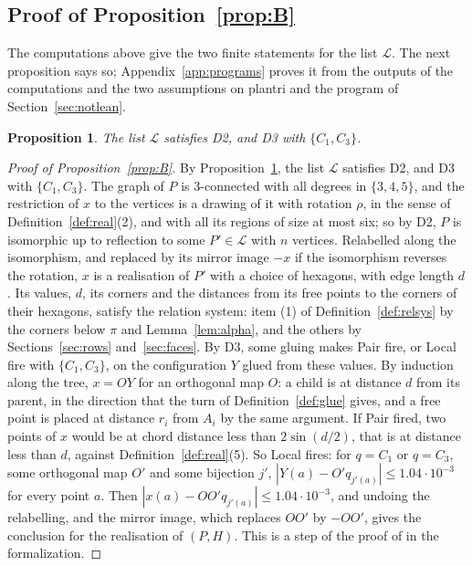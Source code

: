 \documentclass[12pt]{amsart}
\newtheorem{proposition}[theorem]{Proposition}
\theoremstyle{definition}
\theoremstyle{plain}
\theoremstyle{definition}
\newcommand{\CI}{C_1}
\newcommand{\CIII}{C_3}
\newcommand{\codemap}[1]{\ignorespaces}
\newcommand{\mapnote}[1]{\ignorespaces}
\begin{document}
\subsection{Proof of Proposition~\ref{prop:B}}\label{sec:proofB}
The computations above give the two finite statements for the list $\mathcal L$. The next proposition says so; Appendix~\ref{app:programs} proves it from the outputs of the computations and the two assumptions on plantri and the program of Section~\ref{sec:notlean}.

\begin{proposition}\label{prop:lists}\mapnote{not formalized; D2 is a hypothesis of Theorems \ref{thm:formal} and \ref{thm:trees}, and D3 is a hypothesis of Theorem \ref{thm:formal}, proved in Lean from the hypotheses of Theorem \ref{thm:trees} as \texttt{Tammes15.Contractors.killed\_of\_progTreesDom}}\codemap{code/impl1/coverage_join.sh > code/impl1/out/guarded/coverage_join.txt, code/impl1/replay_summary.sh > code/impl1/out/guarded/replay_summary.txt}
The list $\mathcal L$ satisfies D2, and D3 with $\{\CI,\CIII\}$.
\end{proposition}

\begin{proof}[Proof of Proposition~\ref{prop:B}]
By Proposition~\ref{prop:lists}, the list $\mathcal L$ satisfies D2, and D3 with $\{\CI,\CIII\}$. The graph of $P$ is 3-connected with all degrees in $\{3,4,5\}$, and the restriction of $x$ to the vertices is a drawing of it with rotation $\rho$, in the sense of Definition~\ref{def:real}(2), and with all its regions of size at most six; so by D2, $P$ is isomorphic up to reflection to some $P'\in\mathcal L$ with $n$ vertices. Relabelled along the isomorphism, and replaced by its mirror image $-x$ if the isomorphism reverses the rotation, $x$ is a realisation of $P'$ with a choice of hexagons, with edge length $d$. Its values, $d$, its corners and the distances from its free points to the corners of their hexagons, satisfy the relation system: item (1) of Definition~\ref{def:relsys} by the corners below $\pi$ and Lemma~\ref{lem:alpha}, and the others by Sections~\ref{sec:rows} and~\ref{sec:faces}. By D3, some gluing makes Pair fire, or Local fire with $\{\CI,\CIII\}$, on the configuration $Y$ glued from these values. By induction along the tree, $x=OY$ for an orthogonal map $O$: a child is at distance $d$ from its parent, in the direction that the turn of Definition~\ref{def:glue} gives, and a free point is placed at distance $r_i$ from $A_i$ by the same argument. If Pair fired, two points of $x$ would be at chord distance less than $2\sin(d/2)$, that is at distance less than $d$, against Definition~\ref{def:real}(5). So Local fires: for $q=\CI$ or $q=\CIII$, some orthogonal map $O'$ and some bijection $j'$, $|Y(a)-O'q_{j'(a)}|\le1.04\cdot10^{-3}$ for every point $a$. Then $|x(a)-OO'q_{j'(a)}|\le1.04\cdot10^{-3}$, and undoing the relabelling, and the mirror image, which replaces $OO'$ by $-OO'$, gives the conclusion for the realisation of $(P,H)$. This is a step of the proof of  in the formalization.
\end{proof}
\end{document}
